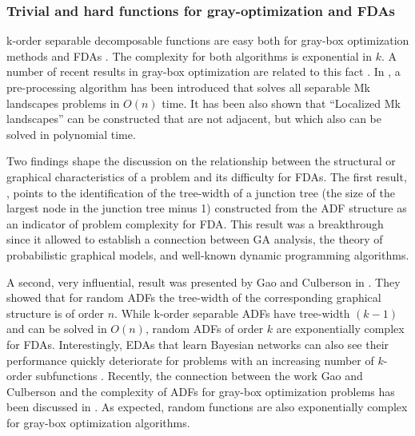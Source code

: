 \documentclass{article} %
\begin{document}
\subsubsection{Trivial and hard functions for gray-optimization and FDAs}

 k-order separable decomposable functions are easy both for gray-box optimization methods \cite{Whitley_and_Chen:2012} and FDAs  \cite{Muhlenbein_et_al:1999}. The complexity for both algorithms is exponential in $k$.  A number of recent results in gray-box optimization are related to this fact \cite{Whitley:2015,Whitley_et_al:2016}.  In \cite{Whitley:2015},  a  pre-processing algorithm has been introduced that solves all separable Mk landscapes problems in $O(n)$ time. It has been also shown that ``Localized Mk landscapes'' can be constructed that are not adjacent, but which also can be solved in polynomial time.


 Two findings shape the discussion on the relationship between the structural or graphical characteristics of a problem and its difficulty for FDAs. The first result,  \cite{Muhlenbein_et_al:1999}, points to the identification of the tree-width of a junction tree (the size of the largest node in the  junction tree minus 1) constructed from the ADF structure as an indicator of problem complexity for FDA. This result was a breakthrough since it allowed to establish a connection between GA analysis, the theory of probabilistic graphical models, and well-known dynamic programming algorithms.

 A second, very influential, result was presented by Gao and Culberson in \cite{Gao_and_Culberson:2005}. They showed that for random ADFs the tree-width of the corresponding graphical structure is of order $n$.  While k-order separable ADFs have tree-width $(k-1)$ and can be solved in $O(n)$,  random ADFs of order $k$ are exponentially complex for FDAs. Interestingly, EDAs that learn Bayesian networks can also see their performance quickly deteriorate for problems with an increasing number of $k$-order subfunctions \cite{Echegoyen_et_al:2011}. Recently, the connection between the work  Gao and Culberson \cite{Gao_and_Culberson:2005} and the complexity of ADFs for gray-box optimization problems has been discussed in \cite{Whitley_et_al:2016}. As expected, random functions are also exponentially complex for gray-box optimization algorithms.
\end{document}

